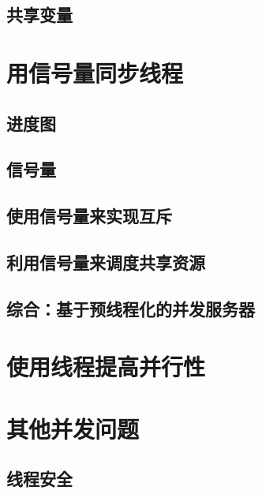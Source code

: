 \pending

\subsection{共享变量}

\pending

\section{用信号量同步线程}

\pending

\subsection{进度图}

\pending

\subsection{信号量}

\pending

\subsection{使用信号量来实现互斥}

\pending

\subsection{利用信号量来调度共享资源}

\pending

\subsection{综合：基于预线程化的并发服务器}

\pending

\section{使用线程提高并行性}

\pending

\section{其他并发问题}

\pending

\subsection{线程安全}

